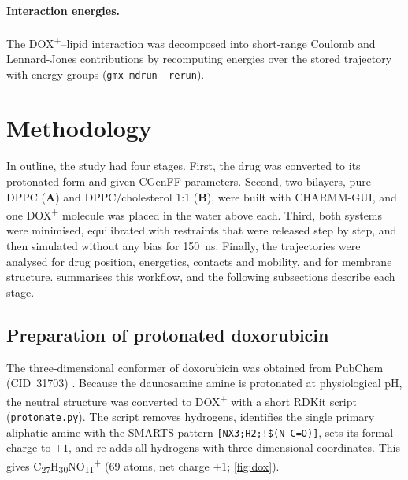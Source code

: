 \documentclass[11pt,a4paper]{article}
\newcommand{\dox}{DOX\textsuperscript{+}}
\newcommand{\sysA}{\textcolor{sysA}{\textbf{A}}}
\newcommand{\sysB}{\textcolor{sysB}{\textbf{B}}}
\begin{document}
\paragraph{Interaction energies.}
The \dox{}--lipid interaction was decomposed into short-range Coulomb and Lennard-Jones contributions
by recomputing energies over the stored trajectory with energy groups (\texttt{gmx mdrun -rerun}).

\section{Methodology}
\label{sec:methods}

In outline, the study had four stages. First, the drug was converted to its protonated form and given
CGenFF parameters. Second, two bilayers, pure DPPC (\sysA) and DPPC/cholesterol 1:1 (\sysB), were built
with CHARMM-GUI, and one \dox{} molecule was placed in the water above each. Third, both systems were
minimised, equilibrated with restraints that were released step by step, and then simulated without any
bias for \SI{150}{ns}. Finally, the trajectories were analysed for drug position, energetics, contacts and
mobility, and for membrane structure.  summarises this workflow, and the following
subsections describe each stage.

\subsection{Preparation of protonated doxorubicin}
The three-dimensional conformer of doxorubicin was obtained from PubChem (CID~31703) \cite{pubchem2023}.
Because the daunosamine amine is protonated at physiological pH, the neutral structure was converted to
\dox{} with a short RDKit \cite{rdkit} script (\texttt{protonate.py}). The script removes hydrogens,
identifies the single primary aliphatic amine with the SMARTS pattern
\texttt{[NX3;H2;!\$(N-C=O)]}, sets its formal charge to $+1$, and re-adds all hydrogens with
three-dimensional coordinates. This gives C\textsubscript{27}H\textsubscript{30}NO\textsubscript{11}\textsuperscript{+}
(69 atoms, net charge $+1$; \cref{fig:dox}).
\end{document}

